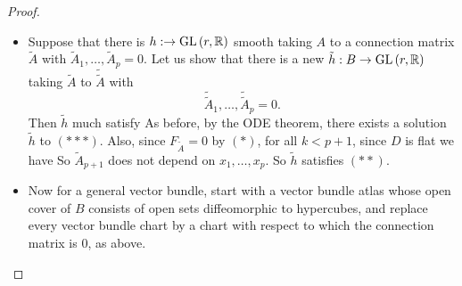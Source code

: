 \documentclass[main.tex]{subfiles}
\begin{document}
\begin{proof}
\begin{itemize}
  \item Suppose that there is $h:  \to \text{GL}\left( r, \mathbb{R} \right)$ smooth taking $A$ to a connection matrix $\tilde{A}$ with $\tilde{A}_1,\dots, \tilde{A}_p = 0$. Let us show that there is a new $\tilde{h}: B \to \text{GL}\left( r, \mathbb{R} \right)$ taking $\tilde{A}$ to $\tilde{\tilde{A}}$ with
  \[
  \tilde{\tilde{A}}_1,\dots, \tilde{\tilde{A}}_p = 0.
  \]
  Then $\tilde{h}$ much satisfy
  As before, by the ODE theorem, there exists a solution $\tilde{h}$ to $(***)$. Also, since $F_{\tilde{A}} = 0$ by $(*)$, for all $k < p+1$, since $D$ is flat we have
  So $\tilde{A}_{p+1}$ does not depend on $x_1,\dots, x_p$. So $\tilde{h}$ satisfies $(**)$.

  \item Now for a general vector bundle, start with a vector bundle atlas whose open cover of $B$ consists of open sets diffeomorphic to hypercubes, and replace every vector bundle chart by a chart with respect to which the connection matrix is $0$, as above.

\end{itemize}
\end{proof}
\end{document}
